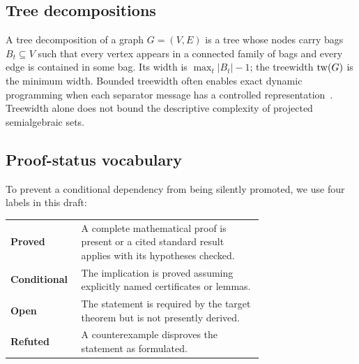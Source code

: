 \subsection{Tree decompositions}

A tree decomposition of a graph \(G=(V,E)\) is a tree whose nodes carry bags
\(B_t\subseteq V\) such that every vertex appears in a connected family of
bags and every edge is contained in some bag.  Its width is
\(\max_t|B_t|-1\); the treewidth \(\operatorname{tw}(G)\) is the minimum width.  Bounded
treewidth often enables exact dynamic programming when each separator message
has a controlled representation~\cite{Bodlaender1996}.  Treewidth alone does
not bound the descriptive complexity of projected semialgebraic sets.

\subsection{Proof-status vocabulary}

To prevent a conditional dependency from being silently promoted, we use four
labels in this draft:
\begin{center}
\begin{tabular}{>{\bfseries}l p{0.72\linewidth}}
\toprule
Proved & A complete mathematical proof is present or a cited standard result
applies with its hypotheses checked.\\
Conditional & The implication is proved assuming explicitly named
certificates or lemmas.\\
Open & The statement is required by the target theorem but is not presently
derived.\\
Refuted & A counterexample disproves the statement as formulated.\\
\bottomrule
\end{tabular}
\end{center}
